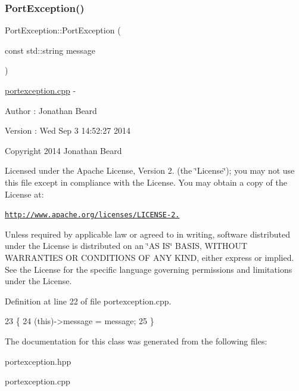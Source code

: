 \subsubsection{\texorpdfstring{Port\+Exception()}{PortException()}}
{\footnotesize\ttfamily Port\+Exception\+::\+Port\+Exception (\begin{DoxyParamCaption}\item[{const std\+::string}]{message }\end{DoxyParamCaption})}

\hyperlink{portexception_8cpp_source}{portexception.\+cpp} -\/ \begin{DoxyAuthor}{Author}
\+: Jonathan Beard 
\end{DoxyAuthor}
\begin{DoxyVersion}{Version}
\+: Wed Sep 3 14\+:52\+:27 2014
\end{DoxyVersion}
Copyright 2014 Jonathan Beard

Licensed under the Apache License, Version 2. (the \char`\"{}\+License\char`\"{}); you may not use this file except in compliance with the License. You may obtain a copy of the License at\+:

\href{http://www.apache.org/licenses/LICENSE-2.0}{\tt http\+://www.\+apache.\+org/licenses/\+L\+I\+C\+E\+N\+S\+E-\/2.}

Unless required by applicable law or agreed to in writing, software distributed under the License is distributed on an \char`\"{}\+A\+S I\+S\char`\"{} B\+A\+S\+IS, W\+I\+T\+H\+O\+UT W\+A\+R\+R\+A\+N\+T\+I\+ES OR C\+O\+N\+D\+I\+T\+I\+O\+NS OF A\+NY K\+I\+ND, either express or implied. See the License for the specific language governing permissions and limitations under the License. 

Definition at line 22 of file portexception.\+cpp.


\begin{DoxyCode}
23 \{
24    (\textcolor{keyword}{this})->message = message;
25 \}
\end{DoxyCode}


The documentation for this class was generated from the following files\+:\begin{DoxyCompactItemize}
\item 
portexception.\+hpp\item 
portexception.\+cpp\end{DoxyCompactItemize}
